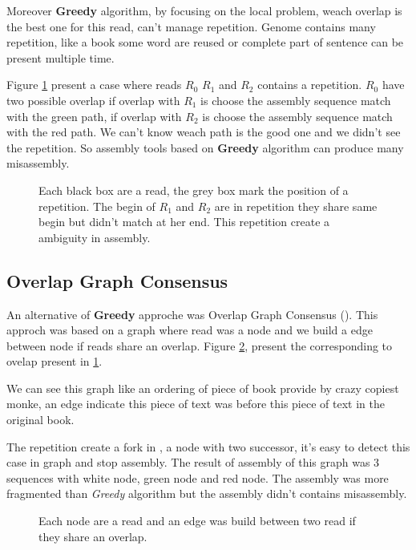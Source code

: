 \documentclass[./main.tex]{subfiles}
\begin{document}
Moreover \textbf{Greedy} algorithm, by focusing on the local problem, weach overlap is the best one for this read, can't manage repetition. Genome contains many repetition, like a book some word are reused or complete part of sentence can be present multiple time.

Figure \ref{intro:fig:greedy:repetition} present a case where reads $R_0$ $R_1$ and $R_2$ contains a repetition. $R_0$ have two possible overlap if overlap with $R_1$ is choose the assembly sequence match with the green path, if overlap with $R_2$ is choose the assembly sequence match with the red path. We can't know weach path is the good one and we didn't see the repetition. So assembly tools based on \textbf{Greedy} algorithm can produce many misassembly. 

\begin{figure}[ht]
    \centering 
    
    \caption{Each black box are a read, the grey box mark the position of a repetition. The begin of $R_1$ and $R_2$ are in repetition they share same begin but didn't match at her end. This repetition create a ambiguity in assembly.}
    \label{intro:fig:greedy:repetition}
\end{figure}

\subsection{Overlap Graph Consensus}

An alternative of \textbf{Greedy} approche was Overlap Graph Consensus (\OLC). This approch was based on a graph where read was a node and we build a edge between node if reads share an overlap. Figure \ref{intro:fig:olc:graph}, present the \OLC corresponding to ovelap present in \ref{intro:fig:greedy:repetition}.

We can see this graph like an ordering of piece of book provide by crazy copiest monke, an edge indicate this piece of text was before this piece of text in the original book.

The repetition create a fork in \OLC, a node with two successor, it's easy to detect this case in graph and stop assembly. The result of assembly of this graph was 3 sequences with white node, green node and red node. The assembly was more fragmented than \textit{Greedy} algorithm but the assembly didn't contains misassembly.

\begin{figure}[ht]
    \centering 
    
    \caption{Each node are a read and an edge was build between two read if they share an overlap.}
    \label{intro:fig:olc:graph}
\end{figure}
\end{document}
